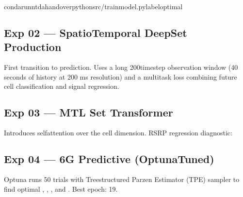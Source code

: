 \documentclass[letterpaper,10pt,english]{sphinxmanual}
\begin{document}
\begin{sphinxVerbatim}[commandchars=\\\{\}]
condarun\PYGZhy{}ntda\PYGZhy{}handoverpythonsrc/train\PYGZus{}model.py\PYGZhy{}\PYGZhy{}labeloptimal
\end{sphinxVerbatim}

\sphinxAtStartPar
{}


\subsection{Exp 02 — SpatioTemporal DeepSet Production}
\label{\detokenize{training:exp-02-spatiotemporal-deepset-production}}
\sphinxAtStartPar
First transition to  prediction. Uses a long 200\sphinxhyphen{}timestep observation window (40 seconds of history at 200 ms resolution) and a multi\sphinxhyphen{}task loss combining future cell classification and signal regression.

\sphinxAtStartPar
{}

\sphinxAtStartPar
{}


\subsection{Exp 03 — MTL Set Transformer}
\label{\detokenize{training:exp-03-mtl-set-transformer}}
\sphinxAtStartPar
Introduces self\sphinxhyphen{}attention over the cell dimension. RSRP regression diagnostic:

\sphinxAtStartPar
{}

\sphinxAtStartPar
{}


\subsection{Exp 04 — 6G Predictive (Optuna\sphinxhyphen{}Tuned)}
\label{\detokenize{training:exp-04-6g-predictive-optuna-tuned}}
\sphinxAtStartPar
Optuna runs 50 trials with Tree\sphinxhyphen{}structured Parzen Estimator (TPE) sampler to find optimal , , , and . Best epoch: 19.
\end{document}
